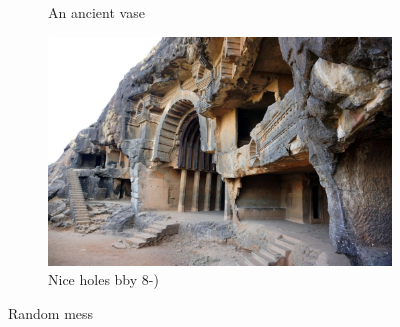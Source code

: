 \documentclass{article}
\begin{document}
\begin{figure}
\begin{subfigure}[b]{0.2\linewidth}
			\caption{An ancient vase}
		\end{subfigure}
		\begin{subfigure}[b]{0.5\linewidth}
			\includegraphics[width=\linewidth]{images/caves.jpg}
			\caption{Nice holes bby 8-)}
		\end{subfigure}
		\caption{Random mess}
		\label{fig:mess}
	\end{figure}
	\newpage
	
	\begin{appendix}
		\listoffigures
	\end{appendix}
	
	
\end{document}
